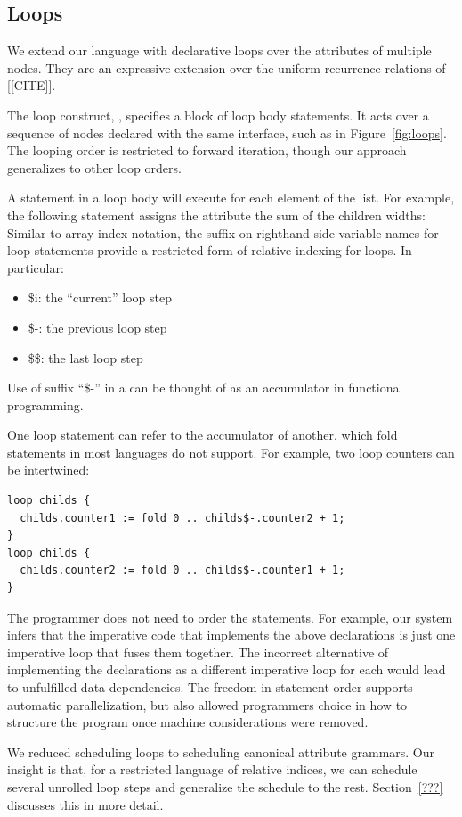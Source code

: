 \subsection{Loops}
We extend our language with declarative loops over the attributes of multiple nodes. They are an expressive extension over the uniform recurrence relations of [[CITE]].

The loop construct, , specifies a block of loop body statements. It acts over a sequence of nodes declared with the same interface, such as  in Figure~\ref{fig:loops}. The looping order is restricted to forward iteration, though our approach generalizes to other loop orders.

A statement in a loop body will execute for each element of the list. For example, the following statement assigns the attribute  the sum of the children widths:
Similar to array index notation, the suffix on righthand-side variable names for loop statements provide a restricted form of relative indexing for loops. In particular:
\begin{itemize}
\item \$i: the ``current'' loop step
\item \$-: the previous loop step
\item \$\$: the last loop step
\end{itemize}
Use of suffix ``\$-'' in a  can be thought of as an accumulator in functional programming. 


One loop statement can refer to the accumulator of another, which fold statements in most languages do not support. For example, two loop counters can be intertwined:
\begin{lstlisting}
loop childs {
  childs.counter1 := fold 0 .. childs$-.counter2 + 1;
}
loop childs {
  childs.counter2 := fold 0 .. childs$-.counter1 + 1;
}
\end{lstlisting}
The programmer does not need to order the statements.  For example, our system infers that the imperative code that implements the above declarations is just one imperative loop that fuses them together. The incorrect alternative of implementing the declarations as a different imperative loop for each would lead to unfulfilled data dependencies. The freedom in statement order supports automatic parallelization, but also allowed programmers choice in how to structure the program once machine considerations were removed.

We reduced scheduling loops to scheduling canonical attribute grammars. Our insight is that, for a restricted language of relative indices, we can schedule several unrolled loop steps and generalize the schedule to the rest. Section~\ref{???} discusses this in more detail. 

